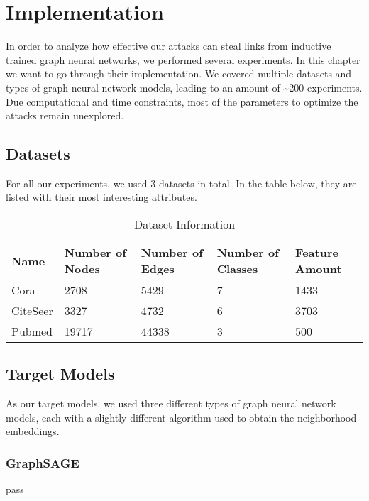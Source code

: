 \chapter{Implementation}

  In order to analyze how effective our attacks can steal links from inductive trained graph neural networks, we performed several experiments.
  In this chapter we want to go through their implementation.
  We covered multiple datasets and types of graph neural network models, leading to an amount of \textasciitilde200 experiments.
  Due computational and time constraints, most of the parameters to optimize the attacks remain unexplored.

  \section{Datasets}

    For all our experiments, we used 3 datasets in total.
    In the table below, they are listed with their most interesting attributes.

    \vspace{0.48cm}
    \begin{table}[!h]
      \centering
      \footnotesize
      \begin{tabular}{l|l|l|l|l}
        \toprule
        Name & Number of Nodes & Number of Edges & Number of Classes & Feature Amount \\
        \midrule
        Cora & 2708            & 5429            & 7                 & 1433 \\
        CiteSeer & 3327        & 4732            & 6                 & 3703 \\
        Pubmed & 19717         & 44338           & 3                 & 500 \\
        \bottomrule
      \end{tabular}
      \caption{Dataset Information}
      \label{table:datasets}
    \end{table}

  \section{Target Models}

    As our target models, we used three different types of graph neural network models, each with a slightly different algorithm used to obtain the neighborhood embeddings.

    \subsection{GraphSAGE}
      pass

